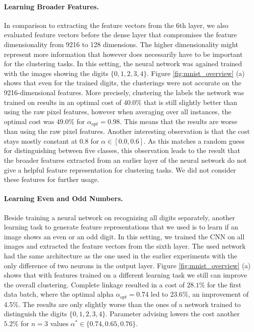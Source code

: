 \paragraph{Learning Broader Features.} In comparison to extracting the feature vectors from the 6th layer, we also evaluated feature vectors before the dense layer that compromises the feature dimensionality from 9216 to 128 dimensions. The higher dimensionality might represent more information that however does necessarily have to be important for the clustering tasks. In this setting, the neural network was agained trained with the images showing the digits $\{0,1,2,3,4\}$. Figure \ref{fig:mnist_overview} (a) shows that even for the trained digits, the clusterings were not accurate on the 9216-dimensional features. More precisely, clustering the labels the network was trained on results in an optimal cost of $40.0\%$ that is still slightly better than using the raw pixel features, however when averaging over all instances, the optimal cost was $49.0\%$ for $\alpha_{opt} = 0.98$. This means that the results are worse than using the raw pixel features. Another interesting observation is that the cost stays mostly constant at $0.8$ for $\alpha \in [0.0,0.6]$. As this matches a random guess for distinguishing between five classes, this observation leads to the result that the broader features extracted from an earlier layer of the neural network do not give a helpful feature representation for clustering tasks. We did not consider these features for further usage.

\paragraph{Learning Even and Odd Numbers.} Beside training a neural network on recognizing all digits separately, another learning task to generate feature representations that we used is to learn if an image shows an even or an odd digit. In this setting, we trained the CNN on all images and extracted the feature vectors from the sixth layer. The used network had the same architecture as the one used in the earlier experiments with the only difference of two neurons in the output layer. Figure \ref{fig:mnist_overview} (a) shows that with features trained on a different learning task we still can improve the overall clustering. Complete linkage resulted in a cost of $28.1\%$ for the first data batch, where the optimal alpha $\alpha_{opt} = 0.74$ led to $23.6\%$, an improvement of 4.5\%. The results are only slightly worse than the ones of a network trained to distinguish the digits $\{0,1,2,3,4\}$. Parameter advising lowers the cost another $5.2\%$ for $n = 3$ values $\alpha^* \in \{0.74, 0.65, 0.76\}$.\\

